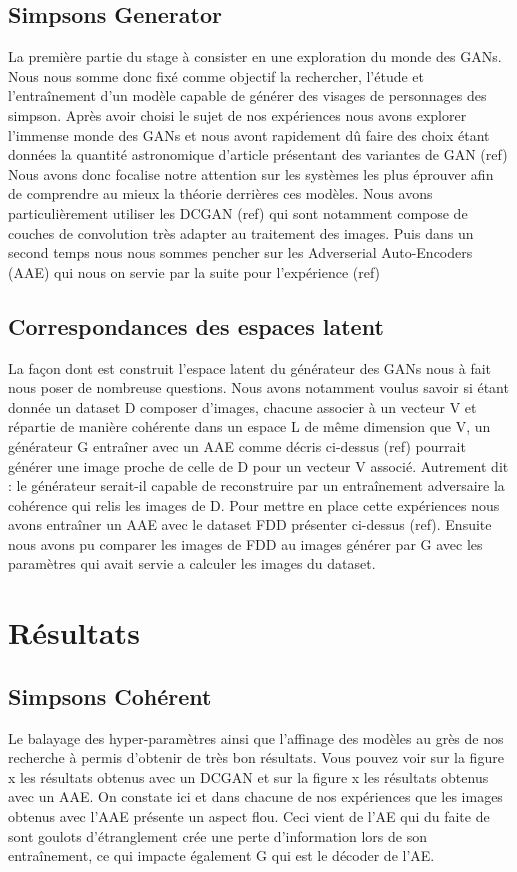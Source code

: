 \documentclass[11pt]{article}
\begin{document}
\subsection{Simpsons Generator}
La première partie du stage à consister en une exploration du monde des GANs. Nous nous somme donc fixé comme objectif la rechercher, l'étude et l'entraînement d'un modèle capable de générer des visages de personnages des simpson.
Après avoir choisi le sujet de nos expériences nous avons explorer l'immense monde des GANs et nous avont rapidement dû faire des choix étant données la quantité astronomique d'article présentant des variantes de GAN (ref)
Nous avons donc focalise notre attention sur les systèmes les plus éprouver afin de comprendre au mieux la théorie derrières ces modèles.
Nous avons particulièrement utiliser les DCGAN (ref) qui sont notamment compose de couches de convolution très adapter au traitement des images. Puis dans un second temps nous nous sommes pencher sur les Adverserial Auto-Encoders (AAE) qui nous on servie par la suite pour l'expérience (ref)

\subsection{Correspondances des espaces latent}
La façon dont est construit l'espace latent du générateur des GANs nous à fait nous poser de nombreuse questions.
Nous avons notamment voulus savoir si étant donnée un dataset D composer d'images, chacune associer à un vecteur V et répartie de manière cohérente dans un espace L de même dimension que V, un générateur G entraîner avec un AAE comme décris ci-dessus (ref) pourrait générer une image proche de celle de D pour un vecteur V associé. Autrement dit : le générateur serait-il capable de reconstruire par un entraînement adversaire la cohérence qui relis les images de D. 
Pour mettre en place cette expériences nous avons entraîner un AAE avec le dataset FDD présenter ci-dessus (ref). Ensuite nous avons pu comparer les images de FDD au images générer par G avec les paramètres qui avait servie a calculer les images du dataset.

\section{Résultats}

\subsection{Simpsons Cohérent}
Le balayage des hyper-paramètres ainsi que l'affinage des modèles au grès de nos recherche à permis d'obtenir de très bon résultats. Vous pouvez voir sur la figure x les résultats obtenus avec un DCGAN et sur la figure x les résultats obtenus avec un AAE.
On constate ici et dans chacune de nos expériences que les images obtenus avec l'AAE présente un aspect flou. Ceci vient de l'AE qui du faite de sont goulots d'étranglement crée une perte d'information lors de son entraînement, ce qui impacte également G qui est le décoder de l'AE.
\end{document}
